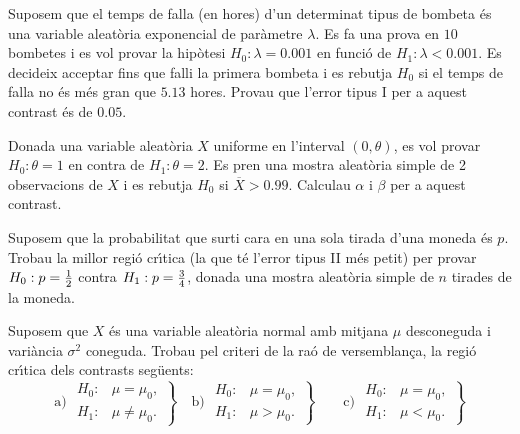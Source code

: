 \begin{prob}
{Suposem que el temps de falla (en hores) d'un determinat tipus de
bombeta \'es una variable aleat\`oria exponencial de par\`ametre $\lambda$. Es fa una prova en $10$
bombetes i es vol provar la hip\`otesi $H_0:\lambda=0.001$ en funci\'o de
$H_1:\lambda<0.001$. Es decideix acceptar fins que falli la primera bombeta i
es rebutja $H_0$ si el temps de falla no \'es m\'es gran que $5.13$ hores. 
Provau que l'error tipus I per a aquest contrast \'es de $0.05$.}
\end{prob}

\begin{prob}
{Donada una variable aleat\`oria $X$ uniforme en l'interval $(0,\theta)$, es vol
provar $H_0:\theta =1$ en contra de $H_1:\theta =2$. Es pren una mostra aleat\`oria simple de 2
observacions de $X$ i es rebutja $H_0$ si $\overline{X}>0.99$. Calculau
$\alpha$ i $\beta$ per a aquest contrast.}
\end{prob}

\begin{prob}
{Suposem que la probabilitat que surti cara en una sola tirada d'una
moneda \'es $p$. Trobau la millor regi\'o cr\'{\i}tica (la que t\'e l'error tipus II m\'es
petit) per provar $H_0:p={1\over 2}$ contra $H_1: p={3\over 4}$, donada una
mostra aleat\`oria simple de $n$ tirades de la moneda.}
\end{prob}

\begin{prob}
{Suposem que $X$ \'es una variable aleat\`oria normal amb mitjana $\mu$ desconeguda i
vari\`ancia $\sigma^2$ coneguda. Trobau pel criteri de la ra\'o de versemblan\c{c}a,
la regi\'o cr\'{\i}tica dels contrasts seg\"uents:
$$\mbox{a) }\left.
\begin{array}{ll}
H_0:&  \mu =\mu_0,\\ H_1 :&  \mu\not
=\mu_0.
\end{array}
\right\}\quad\mbox{b) }\left.
\begin{array}{ll}
H_0 :&   \mu =\mu_0,\\ H_1 :& 
\mu >\mu_0.
\end{array}
\right\}
\quad\quad\mbox{c) }\left.
\begin{array}{ll}
H_0 :&   \mu =\mu_0,\\
H_1 :&  \mu <\mu_0.
\end{array}
\right\}$$}
\end{prob}

